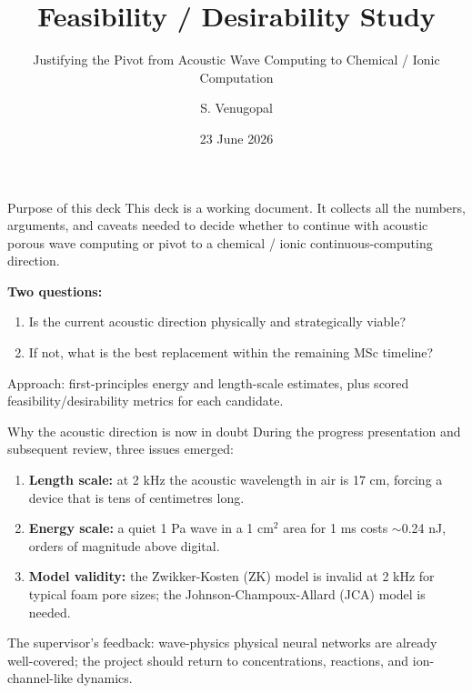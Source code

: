 \documentclass[aspectratio=169,11pt]{beamer}
\title{Feasibility / Desirability Study}
\subtitle{Justifying the Pivot from Acoustic Wave Computing to Chemical / Ionic Computation}
\author{S. Venugopal}
\institute{Cranfield University\hspace{0.3cm}|\hspace{0.3cm}Supervisors: Prof. Weisi Guo, Prof. Takis Tsoutsanis}
\date{23 June 2026}
\begin{document}
\begin{frame}[plain]
  \titlepage
\end{frame}

\begin{frame}{Purpose of this deck}
  This deck is a working document. It collects all the numbers, arguments, and caveats needed to decide whether to continue with acoustic porous wave computing or pivot to a chemical / ionic continuous-computing direction.

  \vspace{0.15cm}
  \textbf{Two questions:}
  \begin{enumerate}
    \item Is the current acoustic direction physically and strategically viable?
    \item If not, what is the best replacement within the remaining MSc timeline?
  \end{enumerate}

  \vspace{0.15cm}
  \textcolor{gdpSlate}{\small Approach: first-principles energy and length-scale estimates, plus scored feasibility/desirability metrics for each candidate.}
\end{frame}

\begin{frame}{Why the acoustic direction is now in doubt}
  During the progress presentation and subsequent review, three issues emerged:
  \begin{enumerate}
    \item \textbf{Length scale:} at 2 kHz the acoustic wavelength in air is 17 cm, forcing a device that is tens of centimetres long.
    \item \textbf{Energy scale:} a quiet 1 Pa wave in a 1 cm$^2$ area for 1 ms costs $\sim$0.24 nJ, orders of magnitude above digital.
    \item \textbf{Model validity:} the Zwikker-Kosten (ZK) model is invalid at 2 kHz for typical foam pore sizes; the Johnson-Champoux-Allard (JCA) model is needed.
  \end{enumerate}

  \vspace{0.15cm}
  The supervisor's feedback: wave-physics physical neural networks are already well-covered; the project should return to concentrations, reactions, and ion-channel-like dynamics.
\end{frame}
\end{document}
